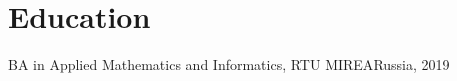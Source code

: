 \section{Education}
\begin{educationEntry}{BA in Applied Mathematics and Informatics, RTU MIREA}{Russia, 2019}
\end{educationEntry}
